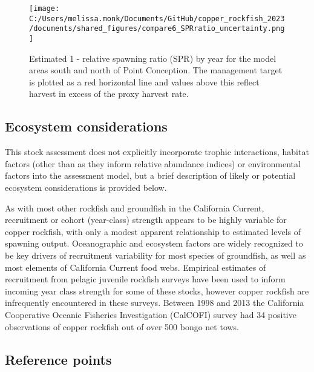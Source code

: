 \documentclass[11pt,
  english,
  letterpaper,
]{article}
\begin{document}


\newpage



\begin{figure}
\centering
\texttt{[image: C:/Users/melissa.monk/Documents/GitHub/copper\_rockfish\_2023/documents/shared\_figures/compare6\_SPRratio\_uncertainty.png]}
\caption{Estimated 1 - relative spawning ratio (SPR) by year for the model areas south and north of Point Conception. The management target is plotted as a red horizontal line and values above this reflect harvest in excess of the proxy harvest rate.\label{fig:es-1-spr}}
\end{figure}

\pagebreak

\hypertarget{ecosystem-considerations}{%
\subsection*{Ecosystem considerations}\label{ecosystem-considerations}}

This stock assessment does not explicitly incorporate trophic interactions, habitat factors (other than as they inform relative abundance indices) or environmental factors into the assessment model, but a brief description of likely or potential ecosystem considerations is provided below.

As with most other rockfish and groundfish in the California Current, recruitment or cohort (year-class) strength appears to be highly variable for copper rockfish, with only a modest apparent relationship to estimated levels of spawning output. Oceanographic and ecosystem factors are widely recognized to be key drivers of recruitment variability for most species of groundfish, as well as most elements of California Current food webs. Empirical estimates of recruitment from pelagic juvenile rockfish surveys have been used to inform incoming year class strength for some of these stocks, however copper rockfish are infrequently encountered in these surveys. Between 1998 and 2013 the California Cooperative Oceanic Fisheries Investigation (CalCOFI) survey had 34 positive observations of copper rockfish out of over 500 bongo net tows.

\hypertarget{reference-points}{%
\subsection*{Reference points}\label{reference-points}}
\end{document}
